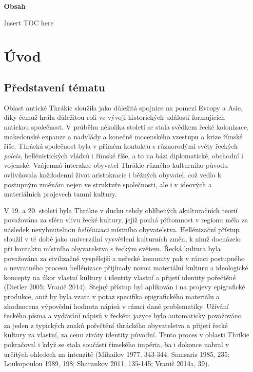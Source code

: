{\bf Obsah}

Insert TOC here

\chapter{Úvod}
\section[představení-tématu]{Představení tématu}

Oblast antické Thrákie sloužila jako důležitá spojnice na pomezí Evropy a Asie, díky čemuž hrála důležitou roli ve vývoji historických událostí formujících antickou společnost. V průběhu několika století se stala svědkem řecké kolonizace, makedonské expanze a nadvlády a konečně mocenského vzestupu a krize římské říše. Thrácká společnost byla v přímém kontaktu s různorodými světy řeckých {\em poleis}, hellénistických vládců i římské říše, a to na bázi diplomatické, obchodní i vojenské. Vzájemná interakce obyvatel Thrákie různého kulturního původu ovlivňovala každodenní život aristokracie i běžných obyvatel, což vedlo k postupným změnám nejen ve struktuře společnosti, ale i v ideových a materiálních projevech tamní kultury.

V 19. a 20. století byla Thrákie v duchu tehdy oblíbených akulturačních teorií považována za sféru vlivu řecké kultury, jejíž pouhá přítomnost v regionu měla za následek nevyhnutelnou {\em hellénizaci} místního obyvatelstva. Hellénizační přístup sloužil v té době jako univerzální vysvětlení kulturních změn, k nimž docházelo při kontaktu místního obyvatelstva s řeckým světem. Řecká kultura byla považována za civilizačně vyspělejší a neřecké komunity pak v rámci postupného a nevratného procesu hellénizace přijímaly novou materiální kulturu a ideologické koncepty na úkor vlastní kultury i identity vlastní a přijetí identity pořečtěné (Dietler 2005; Vranič 2014). Stejný přístup byl aplikován i na projevy epigrafické produkce, aniž by byla vzata v potaz specifika epigrafického materiálu a zhodnocena výpovědní hodnota nápisů v rámci dané problematiky. Užívání řeckého písma a vydávání nápisů v řeckém jazyce bylo automaticky považováno za jeden z typických znaků pořečtění thráckého obyvatelstva a přijetí řecké kultury za vlastní, za cenu ztráty identity původní. Tento proces v oblasti Thríkie pokračoval i když se stala součástí římského impéria, ba i dokonce nabral v určitých ohledech na intenzitě (Mihailov 1977, 343-344; Samsaris 1985, 235; Loukopoulou 1989, 198; Sharankov 2011, 135-145; Vranič 2014a, 39).

